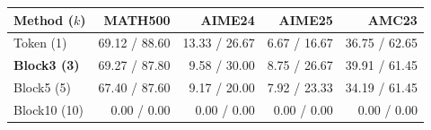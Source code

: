 \begin{tabular}{@{}lrrrr@{}}
\toprule
Method ($k$) & MATH500 & AIME24 & AIME25 & AMC23 \\
\midrule
Token (1) & 69.12 / 88.60 & 13.33 / 26.67 & 6.67 / 16.67 & 36.75 / 62.65 \\
\textbf{Block3 (3)} & 69.27 / 87.80 & 9.58 / 30.00 & 8.75 / 26.67 & 39.91 / 61.45 \\
Block5 (5) & 67.40 / 87.60 & 9.17 / 20.00 & 7.92 / 23.33 & 34.19 / 61.45 \\
Block10 (10) & 0.00 / 0.00 & 0.00 / 0.00 & 0.00 / 0.00 & 0.00 / 0.00 \\
\bottomrule\end{tabular}
